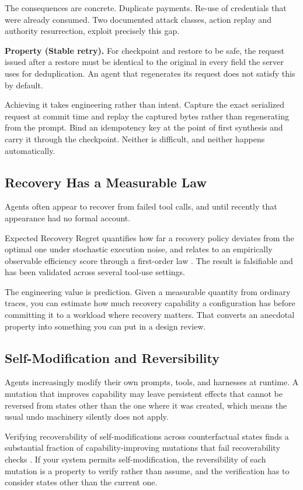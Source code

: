 The consequences are concrete. Duplicate payments. Re-use of credentials that
were already consumed. Two documented attack classes, action replay and
authority resurrection, exploit precisely this gap.

\textbf{Property (Stable retry).} For checkpoint and restore to be safe, the
request issued after a restore must be identical to the original in every field
the server uses for deduplication. An agent that regenerates its request does not
satisfy this by default.

Achieving it takes engineering rather than intent. Capture the exact serialized
request at commit time and replay the captured bytes rather than regenerating
from the prompt. Bind an idempotency key at the point of first synthesis and
carry it through the checkpoint. Neither is difficult, and neither happens
automatically.

\subsection{Recovery Has a Measurable Law}

Agents often appear to recover from failed tool calls, and until recently that
appearance had no formal account.

Expected Recovery Regret quantifies how far a recovery policy deviates from the
optimal one under stochastic execution noise, and relates to an empirically
observable efficiency score through a first-order law \cite{recoverlaw2026}. The
result is falsifiable and has been validated across several tool-use settings.

The engineering value is prediction. Given a measurable quantity from ordinary
traces, you can estimate how much recovery capability a configuration has before
committing it to a workload where recovery matters. That converts an anecdotal
property into something you can put in a design review.

\subsection{Self-Modification and Reversibility}

Agents increasingly modify their own prompts, tools, and harnesses at runtime. A
mutation that improves capability may leave persistent effects that cannot be
reversed from states other than the one where it was created, which means the
usual undo machinery silently does not apply.

Verifying recoverability of self-modifications across counterfactual states finds
a substantial fraction of capability-improving mutations that fail recoverability
checks \cite{evoundo2026}. If your system permits self-modification, the
reversibility of each mutation is a property to verify rather than assume, and
the verification has to consider states other than the current one.

